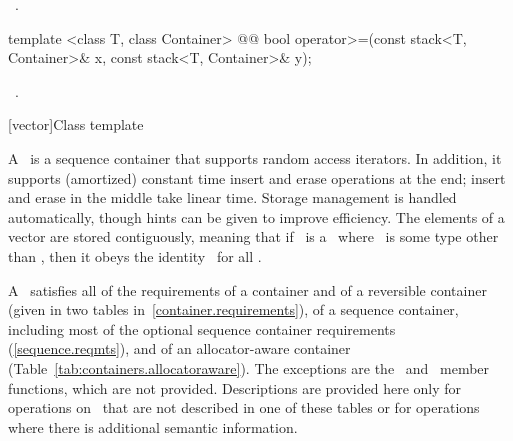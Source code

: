 \documentclass[american,twoside]{book}
\begin{document}
\begin{itemdescr}
\pnum
\returns\ 
.
\end{itemdescr}

%
\begin{itemdecl}
template <class T, class Container>
    @@
    bool operator>=(const stack<T, Container>& x,
                    const stack<T, Container>& y);
\end{itemdecl}

\begin{itemdescr}
\pnum
\returns\ 
.
\end{itemdescr}

[vector]{Class template }

\pnum
{}%
A
\tcode{vector}\
is a sequence container that supports random access iterators.
In addition, it supports (amortized) constant time insert and erase operations at the end;
insert and erase in the middle take linear time.
Storage management is handled automatically, though hints can be given
to improve efficiency.
The elements of a vector are stored contiguously, meaning that if
\tcode{v}\
is a
\
where
\tcode{T}\
is some type other than
,
then it obeys the identity
\tcode{\&v[n] == \&v[0] + n}\
for all
.

\pnum
A \ satisfies all of the requirements of a container and of a reversible container (given in two tables in~\ref{container.requirements}), of a sequence container, including most of the optional sequence container requirements (\ref{sequence.reqmts}), and of an allocator-aware container (Table~\ref{tab:containers.allocatoraware}). The exceptions are the \ and \ member functions, which are not provided. Descriptions are provided here only for operations on \ that are not described in one of these tables or for operations where there is additional semantic information.
\end{document}
